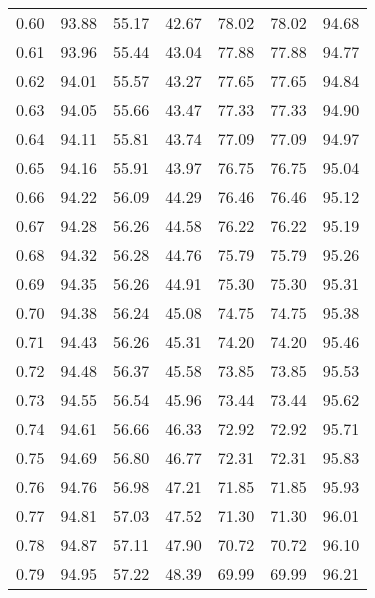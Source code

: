 \begin{tabular}{|c|c|c|c|c|c|c|}
      0.60 &     93.88 &     55.17 &      42.67 &   78.02 &      78.02 &         94.68 \\
      0.61 &     93.96 &     55.44 &      43.04 &   77.88 &      77.88 &         94.77 \\
      0.62 &     94.01 &     55.57 &      43.27 &   77.65 &      77.65 &         94.84 \\
      0.63 &     94.05 &     55.66 &      43.47 &   77.33 &      77.33 &         94.90 \\
      0.64 &     94.11 &     55.81 &      43.74 &   77.09 &      77.09 &         94.97 \\
      0.65 &     94.16 &     55.91 &      43.97 &   76.75 &      76.75 &         95.04 \\
      0.66 &     94.22 &     56.09 &      44.29 &   76.46 &      76.46 &         95.12 \\
      0.67 &     94.28 &     56.26 &      44.58 &   76.22 &      76.22 &         95.19 \\
      0.68 &     94.32 &     56.28 &      44.76 &   75.79 &      75.79 &         95.26 \\
      0.69 &     94.35 &     56.26 &      44.91 &   75.30 &      75.30 &         95.31 \\
      0.70 &     94.38 &     56.24 &      45.08 &   74.75 &      74.75 &         95.38 \\
      0.71 &     94.43 &     56.26 &      45.31 &   74.20 &      74.20 &         95.46 \\
      0.72 &     94.48 &     56.37 &      45.58 &   73.85 &      73.85 &         95.53 \\
      0.73 &     94.55 &     56.54 &      45.96 &   73.44 &      73.44 &         95.62 \\
      0.74 &     94.61 &     56.66 &      46.33 &   72.92 &      72.92 &         95.71 \\
      0.75 &     94.69 &     56.80 &      46.77 &   72.31 &      72.31 &         95.83 \\
      0.76 &     94.76 &     56.98 &      47.21 &   71.85 &      71.85 &         95.93 \\
      0.77 &     94.81 &     57.03 &      47.52 &   71.30 &      71.30 &         96.01 \\
      0.78 &     94.87 &     57.11 &      47.90 &   70.72 &      70.72 &         96.10 \\
      0.79 &     94.95 &     57.22 &      48.39 &   69.99 &      69.99 &         96.21 \\

\end{tabular}
